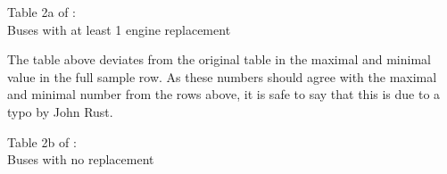 \documentclass[a4paper,12pt,bold]{scrartcl}
\begin{document}
\newpage

\begin{table}[h]
\begin{center}
  
  \caption{Table 2a of \cite{Rust.1987}: \\ Buses with at least 1 engine replacement}
\end{center}
\end{table}
The table above deviates from the original table in the maximal and minimal value in the full sample row. As these numbers should agree with the maximal and minimal number from the rows above, it is safe to say that this is due to a typo by John Rust. \\
\begin{table}[h]
\begin{center}
  
  \caption{Table 2b of \cite{Rust.1987}: \\ Buses with no replacement}
\end{center}
\end{table}

\newpage
\end{document}
